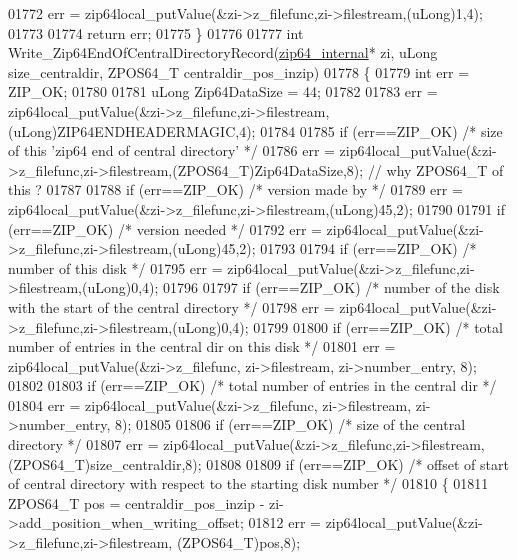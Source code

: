 \begin{DoxyCode}
01772       err = zip64local\_putValue(&zi->z\_filefunc,zi->filestream,(uLong)1,4);
01773 
01774     \textcolor{keywordflow}{return} err;
01775 \}
01776 
01777 \textcolor{keywordtype}{int} Write\_Zip64EndOfCentralDirectoryRecord(\hyperlink{structzip64__internal}{zip64\_internal}* zi, uLong size\_centraldir, 
      ZPOS64\_T centraldir\_pos\_inzip)
01778 \{
01779   \textcolor{keywordtype}{int} err = ZIP\_OK;
01780 
01781   uLong Zip64DataSize = 44;
01782 
01783   err = zip64local\_putValue(&zi->z\_filefunc,zi->filestream,(uLong)ZIP64ENDHEADERMAGIC,4);
01784 
01785   \textcolor{keywordflow}{if} (err==ZIP\_OK) \textcolor{comment}{/* size of this 'zip64 end of central directory' */}
01786     err = zip64local\_putValue(&zi->z\_filefunc,zi->filestream,(ZPOS64\_T)Zip64DataSize,8); \textcolor{comment}{// why ZPOS64\_T of
       this ?}
01787 
01788   \textcolor{keywordflow}{if} (err==ZIP\_OK) \textcolor{comment}{/* version made by */}
01789     err = zip64local\_putValue(&zi->z\_filefunc,zi->filestream,(uLong)45,2);
01790 
01791   \textcolor{keywordflow}{if} (err==ZIP\_OK) \textcolor{comment}{/* version needed */}
01792     err = zip64local\_putValue(&zi->z\_filefunc,zi->filestream,(uLong)45,2);
01793 
01794   \textcolor{keywordflow}{if} (err==ZIP\_OK) \textcolor{comment}{/* number of this disk */}
01795     err = zip64local\_putValue(&zi->z\_filefunc,zi->filestream,(uLong)0,4);
01796 
01797   \textcolor{keywordflow}{if} (err==ZIP\_OK) \textcolor{comment}{/* number of the disk with the start of the central directory */}
01798     err = zip64local\_putValue(&zi->z\_filefunc,zi->filestream,(uLong)0,4);
01799 
01800   \textcolor{keywordflow}{if} (err==ZIP\_OK) \textcolor{comment}{/* total number of entries in the central dir on this disk */}
01801     err = zip64local\_putValue(&zi->z\_filefunc, zi->filestream, zi->number\_entry, 8);
01802 
01803   \textcolor{keywordflow}{if} (err==ZIP\_OK) \textcolor{comment}{/* total number of entries in the central dir */}
01804     err = zip64local\_putValue(&zi->z\_filefunc, zi->filestream, zi->number\_entry, 8);
01805 
01806   \textcolor{keywordflow}{if} (err==ZIP\_OK) \textcolor{comment}{/* size of the central directory */}
01807     err = zip64local\_putValue(&zi->z\_filefunc,zi->filestream,(ZPOS64\_T)size\_centraldir,8);
01808 
01809   \textcolor{keywordflow}{if} (err==ZIP\_OK) \textcolor{comment}{/* offset of start of central directory with respect to the starting disk number */}
01810   \{
01811     ZPOS64\_T pos = centraldir\_pos\_inzip - zi->add\_position\_when\_writing\_offset;
01812     err = zip64local\_putValue(&zi->z\_filefunc,zi->filestream, (ZPOS64\_T)pos,8);

\end{DoxyCode}
